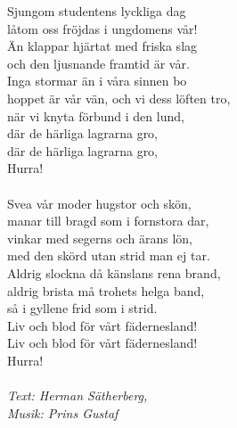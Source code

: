 \vspace{10pt}
Sjungom studentens lyckliga dag\\
låtom oss fröjdas i ungdomens vår!\\
Än klappar hjärtat med friska slag\\
och den ljusnande framtid är vår.\\
Inga stormar än i våra sinnen bo\\
hoppet är vår vän, och vi dess löften tro,\\
när vi knyta förbund i den lund,\\
där de härliga lagrarna gro,\\
där de härliga lagrarna gro,\\
Hurra!\\
\\
Svea vår moder hugstor och skön,\\
manar till bragd som i fornstora dar,\\
vinkar med segerns och ärans lön,\\
med den skörd utan strid man ej tar.\\
Aldrig slockna då känslans rena brand,\\
aldrig brista må trohets helga band,\\
så i gyllene frid som i strid.\\
Liv och blod för vårt fädernesland!\\
Liv och blod för vårt fädernesland!\\
Hurra!\\
\\
{\footnotesize\textit{Text: Herman Sätherberg, \\
Musik: Prins Gustaf}}
